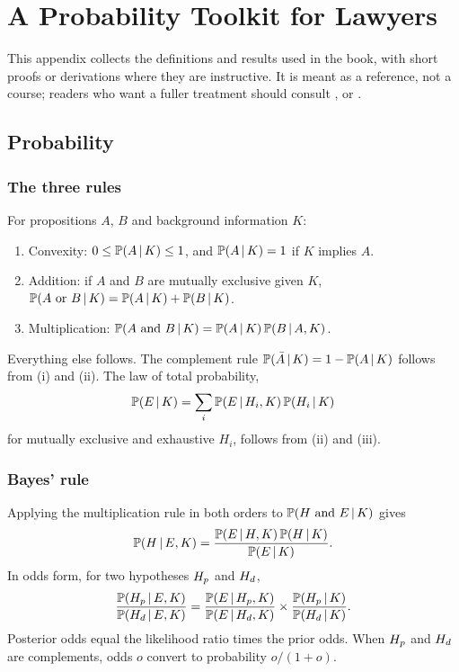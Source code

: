 \chapter{A Probability Toolkit for Lawyers}
\label{app:toolkit}

This appendix collects the definitions and results used in the book, with short proofs or derivations where they are instructive. It is meant as a reference, not a course; readers who want a fuller treatment should consult \citet{lindley2006}, \citet{kadane2011} or \citet{aitken_taroni2004}.

\section{Probability}

\subsection{The three rules}

For propositions $A$, $B$ and background information $K$:
\begin{enumerate}[label=(\roman*)]
\item Convexity: $0 \le \mathbb{P}(A\,\vert\, K) \le 1$, and $\mathbb{P}(A\,\vert\, K) = 1$ if $K$ implies $A$.
\item Addition: if $A$ and $B$ are mutually exclusive given $K$, $\mathbb{P}(A \text{ or } B\,\vert\, K) = \mathbb{P}(A\,\vert\, K) + \mathbb{P}(B\,\vert\, K)$.
\item Multiplication: $\mathbb{P}(A\text{ and } B\,\vert\, K) = \mathbb{P}(A\,\vert\, K)\,\mathbb{P}(B\,\vert\, A, K)$.
\end{enumerate}
Everything else follows. The complement rule $\mathbb{P}(\bar A\,\vert\, K) = 1 - \mathbb{P}(A\,\vert\, K)$ follows from (i) and (ii). The law of total probability,
\[
\mathbb{P}(E\,\vert\, K) = \sum_i \mathbb{P}(E\,\vert\, H_i, K)\,\mathbb{P}(H_i\,\vert\, K)
\]
for mutually exclusive and exhaustive $H_i$, follows from (ii) and (iii).

\subsection{Bayes' rule}

Applying the multiplication rule in both orders to $\mathbb{P}(H\text{ and }E\,\vert\, K)$ gives
\[
\mathbb{P}(H\,\vert\, E, K) = \frac{\mathbb{P}(E\,\vert\, H, K)\,\mathbb{P}(H\,\vert\, K)}{\mathbb{P}(E\,\vert\, K)} .
\]
In odds form, for two hypotheses $H_{p}$ and $H_{d}$,
\[
\frac{\mathbb{P}(H_{p}\,\vert\, E,K)}{\mathbb{P}(H_{d}\,\vert\, E,K)} = \frac{\mathbb{P}(E\,\vert\,H_{p},K)}{\mathbb{P}(E\,\vert\, H_{d}, K)}\times \frac{\mathbb{P}(H_{p}\,\vert\, K)}{\mathbb{P}(H_{d}\,\vert\, K)} .
\]
Posterior odds equal the likelihood ratio times the prior odds. When $H_{p}$ and $H_{d}$ are complements, odds $o$ convert to probability $o/(1+o)$.

